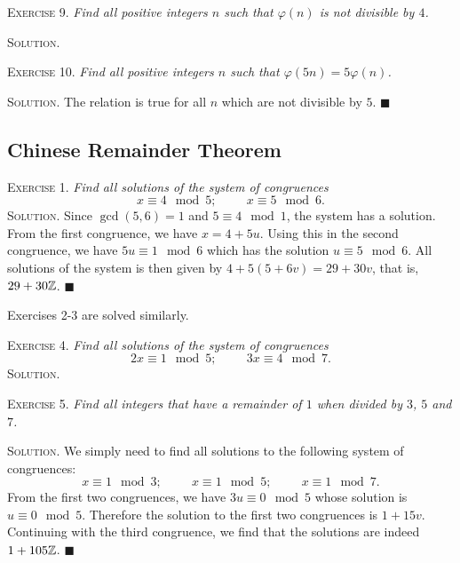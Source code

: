 \documentclass[11pt, leqno]{article}
\newcommand{\done}{\ensuremath{\blacksquare}}
\begin{document}
\textsc{Exercise 9}. \emph{Find all positive integers $n$ such that $\varphi(n)$ is not divisible by $4$.}

\textsc{Solution}.

\textsc{Exercise 10}. \emph{Find all positive integers $n$ such that $\varphi(5n) = 5\varphi(n)$.}

\textsc{Solution}. The relation is true for all $n$ which are not divisible by $5$. \done

\subsection{Chinese Remainder Theorem}

\textsc{Exercise 1}. \emph{Find all solutions of the system of congruences 
\begin{displaymath}
x \equiv 4 \mod 5; \hspace{1cm} x\equiv 5 \mod 6.
\end{displaymath}}\textsc{Solution}. Since $\gcd(5,6)=1$ and $5 \equiv 4 \mod 1$, the system has a solution. From the first congruence, we have $x=4+5u$. Using this in the second congruence, we have $5u\equiv 1 \mod 6$ which has the solution $u \equiv 5 \mod 6$. All solutions of the system is then given by $4+5(5+6v) = 29 + 30v$, that is, $29+30\mathbb{Z}$. \done

Exercises 2-3 are solved similarly.

\textsc{Exercise 4}. \emph{Find all solutions of the system of congruences 
\begin{displaymath}
2x \equiv 1 \mod 5; \hspace{1cm} 3x\equiv 4 \mod 7. 
\end{displaymath}}\textsc{Solution}.

\textsc{Exercise 5}. \emph{Find all integers that have a remainder of $1$ when divided by $3$, $5$ and $7$.}

\textsc{Solution}. We simply need to find all solutions to the following system of congruences: 
\begin{displaymath}
x\equiv 1 \mod 3; \hspace{1cm} x\equiv 1 \mod 5; \hspace{1cm} x \equiv 1 \mod 7.
\end{displaymath}
From the first two congruences, we have $3u \equiv 0\mod 5$ whose solution is $u\equiv 0 \mod 5$. Therefore the solution to the first two congruences is $1+15v$. Continuing with the third congruence, we find that the solutions are indeed $1+105\mathbb{Z}$. \done
\end{document}
